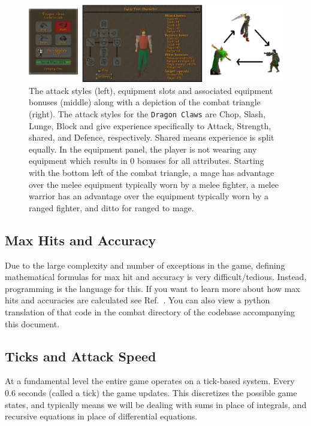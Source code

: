 


		\begin{figure}
			\centering
			\includegraphics[width=\linewidth]{img/combat/Equipment_Stats_interface_and_triangle.png}
			\caption{The attack styles (left), equipment slots and associated equipment bonuses (middle) along with a depiction of the combat triangle (right). The attack styles for the \texttt{Dragon Claws} are Chop, Slash, Lunge, Block and give experience specifically to Attack, Strength, shared, and Defence, respectively. Shared means experience is split equally. In the equipment panel, the player is not wearing any equipment which results in 0 bonuses for all attributes. Starting with the bottom left of the combat triangle, a mage has advantage over the melee equipment typically worn by a melee fighter, a melee warrior has an advantage over the equipment typically worn by a ranged fighter, and ditto for ranged to mage.
			}
			\label{fig:equipment_stats_and_triangle}
		\end{figure}

	\subsection{Max Hits and Accuracy}
		Due to the large complexity and number of exceptions in the game, defining mathematical formulas for max hit and accuracy is very difficult/tedious. Instead, programming is the language for this. If you want to learn more about how max hits and accuracies are calculated see Ref.~\cite{bitter:dps_calculator}. You can also view a python translation of that code in the combat directory of the codebase accompanying this document.

	\subsection{Ticks and Attack Speed}
		At a fundamental level the entire game operates on a tick-based system. Every 0.6 seconds (called a tick) the game updates. This discretizes the possible game states, and typically means we will be dealing with sums in place of integrals, and recursive equations in place of differential equations.

